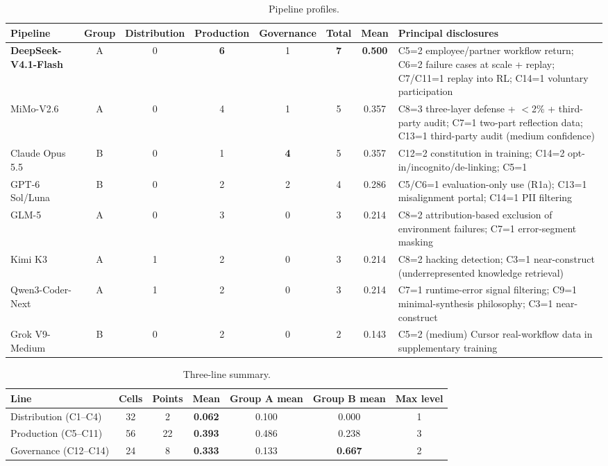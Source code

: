 \documentclass[10pt]{article}
\begin{document}
\begin{table}[t]
\centering
\caption{Pipeline profiles.}
\label{tab:pipelines}
\small
\begin{tabularx}{\textwidth}{l c c c c c c Y}
\toprule
Pipeline & Group & Distribution & Production & Governance & Total & Mean & Principal disclosures \\
\midrule
\textbf{DeepSeek-V4.1-Flash} & A & 0 & \textbf{6} & 1 & \textbf{7} & \textbf{0.500} & C5=2 employee/partner workflow return; C6=2 failure cases at scale + replay; C7/C11=1 replay into RL; C14=1 voluntary participation \\
MiMo-V2.6 & A & 0 & 4 & 1 & 5 & 0.357 & C8=3 three-layer defense + $<$2\% + third-party audit; C7=1 two-part reflection data; C13=1 third-party audit (medium confidence) \\
Claude Opus 5.5 & B & 0 & 1 & \textbf{4} & 5 & 0.357 & C12=2 constitution in training; C14=2 opt-in/incognito/de-linking; C5=1 \\
GPT-6 Sol/Luna & B & 0 & 2 & 2 & 4 & 0.286 & C5/C6=1 evaluation-only use (R1a); C13=1 misalignment portal; C14=1 PII filtering \\
GLM-5 & A & 0 & 3 & 0 & 3 & 0.214 & C8=2 attribution-based exclusion of environment failures; C7=1 error-segment masking \\
Kimi K3 & A & 1 & 2 & 0 & 3 & 0.214 & C8=2 hacking detection; C3=1 near-construct (underrepresented knowledge retrieval) \\
Qwen3-Coder-Next & A & 1 & 2 & 0 & 3 & 0.214 & C7=1 runtime-error signal filtering; C9=1 minimal-synthesis philosophy; C3=1 near-construct \\
Grok V9-Medium & B & 0 & 2 & 0 & 2 & 0.143 & C5=2 (medium) Cursor real-workflow data in supplementary training \\
\bottomrule
\end{tabularx}
\end{table}

\begin{table}[t]
\centering
\caption{Three-line summary.}
\label{tab:lines}
\small
\begin{tabular}{l c c c c c c}
\toprule
Line & Cells & Points & Mean & Group A mean & Group B mean & Max level \\
\midrule
Distribution (C1--C4) & 32 & 2 & \textbf{0.062} & 0.100 & 0.000 & 1 \\
Production (C5--C11) & 56 & 22 & \textbf{0.393} & 0.486 & 0.238 & 3 \\
Governance (C12--C14) & 24 & 8 & \textbf{0.333} & 0.133 & \textbf{0.667} & 2 \\
\bottomrule
\end{tabular}
\end{table}
\end{document}
